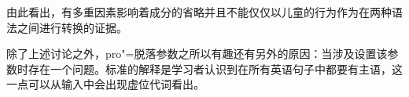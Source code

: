 由此看出，有多重因素影响着成分的省略并且不能仅仅以儿童的行为作为在两种语法之间进行转换的证据。

除了上述讨论之外，pro"=脱落参数之所以有趣还有另外的原因：当涉及设置该参数时存在一个问题。标准的解释是学习者认识到在所有英语句子中都要有主语，这一点可以从输入中会出现虚位代词看出。

